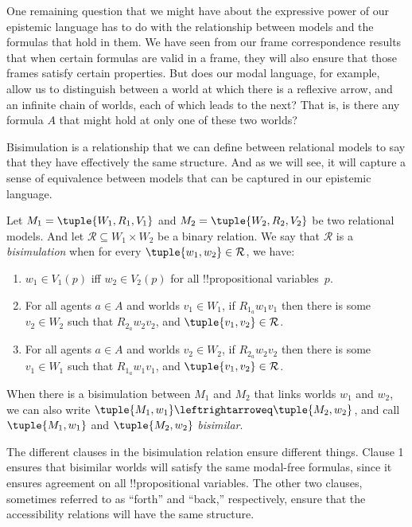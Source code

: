 \documentclass[../../../include/open-logic-section]{subfiles}
\begin{document}


One remaining question that we might have about the expressive power
of our epistemic language has to do with the relationship between
models and the formulas that hold in them. We have seen from our frame
correspondence results that when certain formulas are valid in a
frame, they will also ensure that those frames satisfy certain
properties. But does our modal language, for example, allow us to
distinguish between a world at which there is a reflexive arrow, and
an infinite chain of worlds, each of which leads to the next? That is,
is there any formula $A$ that might hold at only one of these two
worlds?

Bisimulation is a relationship that we can define between relational
models to say that they have effectively the same structure. And as we
will see, it will capture a sense of equivalence between models that
can be captured in our epistemic language.

\begin{defn}[Bisimulation]
Let $M_1 = \tuple{W_1, R_1, V_1}$ and $M_2 = \tuple{W_2, R_2, V_2}$ be
two relational models. And let $\mathcal{R} \subseteq W_1 \times W_2$
be a binary relation. We say that $\mathcal{R}$ is a
\emph{bisimulation} when for every $\tuple{w_1, w_2} \in \mathcal{R}$,
we have:

\begin{enumerate}
  \item $w_1 \in V_1(p)$ iff $w_2 \in V_2(p)$ for all
  !!{propositional variable}s~$p$.
  \item For all agents $a \in A$ and worlds $v_1 \in W_1$, if
  $R_{1_a} w_1 v_1$ then there is some $v_2 \in W_2$ such that
  $R_{2_a} w_2 v_2$, and $\tuple{v_1, v_2} \in
  \mathcal{R}$.
  \item For all agents $a \in A$ and worlds $v_2 \in W_2$, if
   $R_{2_a} w_2 v_2$ then there is some $v_1 \in W_1$ such that
   $R_{1_a} w_1 v_1$, and $\tuple{v_1, v_2} \in
   \mathcal{R}$.
\end{enumerate}

When there is a bisimulation between $M_1$ and $M_2$ that links worlds
$w_1$ and $w_2$, we can also write $\tuple{M_1, w_1} \leftrightarroweq
\tuple{M_2, w_2}$, and call $\tuple{M_1, w_1}$ and $\tuple{M_2, w_2}$
\emph{bisimilar}.
\end{defn}

The different clauses in the bisimulation relation ensure different
things. Clause 1 ensures that bisimilar worlds will satisfy the same
modal-free formulas, since it ensures agreement on all
!!{propositional variable}s. The other two clauses, sometimes referred
to as ``forth'' and ``back,'' respectively, ensure that the
accessibility relations will have the same structure.
\end{document}
